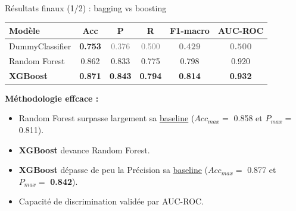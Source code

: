 \documentclass[aspectratio=169, 10pt]{beamer}
\newcommand{\bhref}[2]{\textcolor{blue}{\href{#1}{#2}}}
\begin{document}
\begin{frame}{Résultats finaux (1/2) : bagging vs boosting}

    \begin{table}[]
        \centering
        \begin{tabular}{lccccc}
        \toprule
\textbf{Modèle} & \textbf{Acc} & \textbf{P} & \textbf{R} & \textbf{F1-macro} & \textbf{AUC-ROC} \\
		\midrule
DummyClassifier          & \alert{\textbf{0.753}} & \textcolor{gray}{0.376} & \textcolor{gray}{0.500} & \textcolor{gray}{\textbf{0.429}} & \textcolor{gray}{\textbf{0.500}} \\
Random Forest            & 0.862 & 0.833 & 0.775 & 0.798 & 0.920 \\
\textbf{XGBoost}         & \textbf{0.871} & \alert{\textbf{0.843}} & \textbf{0.794} & \textbf{0.814} & \textbf{0.932} \\
        \bottomrule
        \end{tabular}
    \end{table}

    \vspace{0.5cm}
    \pause
\textbf{Méthodologie effcace :}
\begin{itemize}
    \pause
    \item Random Forest surpasse largement sa \bhref{https://archive.ics.uci.edu/dataset/2/adult}{baseline} ($Acc_{max} =$ 0.858 et $P_{max} =$ 0.811).
    \pause
    \item \textbf{XGBoost} devance Random Forest. 
    \pause
    \item \textbf{XGBoost} dépasse de peu la Précision sa \bhref{https://archive.ics.uci.edu/dataset/2/adult}{baseline} ($Acc_{max} =$ 0.877 et $P_{max} =$ \alert{\textbf{0.842}}).
    \pause
    \item Capacité de discrimination validée par AUC-ROC.
\end{itemize}
\end{frame}
\end{document}
